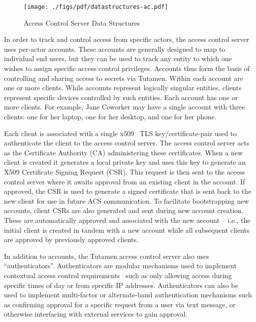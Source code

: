 \begin{figure}[th]
  \centering
  \texttt{[image: ./figs/pdf/datastructures-ac.pdf]}
  \caption{Access Control Server Data Structures}
  \label{fig:tutamen:acstructs}
\end{figure}

In order to track and control access from specific actors, the access
control server uses per-actor accounts. These accounts are generally
designed to map to individual end users, but they can be used to track
any entity to which one wishes to assign specific access control
privileges. Accounts thus form the basis of controlling and sharing
access to secrets via Tutamen. Within each account are one or more
clients. While accounts represent logically singular entities, clients
represent specific devices controlled by such entities. Each account
has one or more clients. For example, Jane Coworker may have a single
account with three clients: one for her laptop, one for her desktop,
and one for her phone.

Each client is associated with a single x509~\cite{rfc5280} TLS
key/certificate-pair used to authenticate the client to the access
control server. The access control server acts as the Certificate
Authority (CA) administering these certificates. When a new client is
created it generates a local private key and uses this key to generate
an X509 Certificate Signing Request (CSR). This request is then sent
to the access control server where it awaits approval from an existing
client in the account. If approved, the CSR is used to generate a
signed certificate that is sent back to the new client for use in
future ACS communication. To facilitate bootstrapping new accounts,
client CSRs are also generated and sent during new account
creation. These are automatically approved and associated with the new
account -- i.e., the initial client is created in tandem with a new
account while all subsequent clients are approved by previously
approved clients.

In addition to accounts, the Tutamen access control server also uses
``authenticators''. Authenticators are modular mechanisms used to
implement contextual access control requirements~\cite{hulsebosch2005}
such as only allowing access during specific times of day or from
specific IP addresses. Authenticators can also be used to implement
multi-factor or alternate-band authentication mechanisms such as
confirming approval for a specific request from a user via text
message, or otherwise interfacing with external services to gain
approval.

